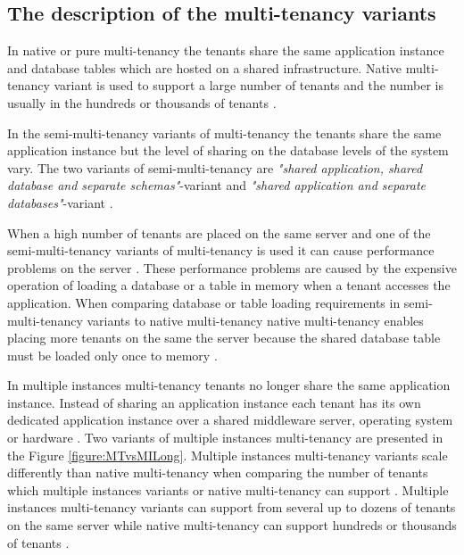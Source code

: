 \documentclass[conference]{sasmoota2017}
\begin{document}
\subsection{The description of the multi-tenancy variants}

In native or pure multi-tenancy \cite{Kabbedijk2015:Defining, Guo:2007:FrameworkForNative} the tenants share the same application instance and database tables which are hosted on a shared infrastructure. Native multi-tenancy variant is used to support a large number of tenants and the number is usually in the hundreds or thousands of tenants \cite{Guo:2007:FrameworkForNative}. 

In the semi-multi-tenancy variants of multi-tenancy \cite{Chong:2006:MultiTenantDataArchitecture, Bezemer:2010:MaintenanceDream} the tenants share the same application instance but the level of sharing on the database levels of the system vary. The two variants of semi-multi-tenancy are \textit{"shared application, shared database and separate schemas"}-variant and \textit{"shared application and separate databases"}-variant \cite{Chong:2006:MultiTenantDataArchitecture}. 

When a high number of tenants are placed on the same server and one of the semi-multi-tenancy variants of multi-tenancy is used it can cause performance problems on the server \cite{Bezemer:2010:MaintenanceDream}. These performance problems are caused by the expensive operation of loading a database or a table in memory when a tenant accesses the application. When comparing database or table loading requirements in semi-multi-tenancy variants to native multi-tenancy native multi-tenancy enables placing more tenants on the same the server because the shared database table must be loaded only once to memory \cite{Bezemer:2010:MaintenanceDream}.

In multiple instances multi-tenancy \cite{Guo:2007:FrameworkForNative} tenants no longer share the same application instance. Instead of sharing an application instance each tenant has its own dedicated application instance over a shared middleware server, operating system or hardware \cite{Guo:2007:FrameworkForNative}. Two variants of multiple instances multi-tenancy are presented in the Figure \ref{figure:MTvsMILong}. Multiple instances multi-tenancy variants scale differently than native multi-tenancy when comparing the number of tenants which multiple instances variants or native multi-tenancy can support \cite{Guo:2007:FrameworkForNative}. Multiple instances multi-tenancy variants can support from several up to dozens of tenants on the same server while native multi-tenancy can support hundreds or thousands of tenants \cite{Guo:2007:FrameworkForNative}.
\end{document}
